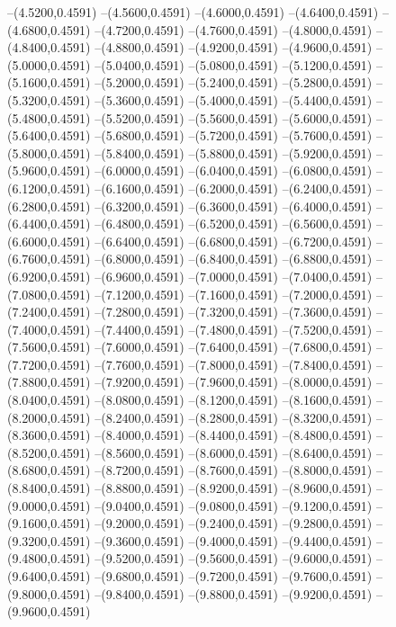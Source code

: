 {	--(4.5200,0.4591)
	--(4.5600,0.4591)
	--(4.6000,0.4591)
	--(4.6400,0.4591)
	--(4.6800,0.4591)
	--(4.7200,0.4591)
	--(4.7600,0.4591)
	--(4.8000,0.4591)
	--(4.8400,0.4591)
	--(4.8800,0.4591)
	--(4.9200,0.4591)
	--(4.9600,0.4591)
	--(5.0000,0.4591)
	--(5.0400,0.4591)
	--(5.0800,0.4591)
	--(5.1200,0.4591)
	--(5.1600,0.4591)
	--(5.2000,0.4591)
	--(5.2400,0.4591)
	--(5.2800,0.4591)
	--(5.3200,0.4591)
	--(5.3600,0.4591)
	--(5.4000,0.4591)
	--(5.4400,0.4591)
	--(5.4800,0.4591)
	--(5.5200,0.4591)
	--(5.5600,0.4591)
	--(5.6000,0.4591)
	--(5.6400,0.4591)
	--(5.6800,0.4591)
	--(5.7200,0.4591)
	--(5.7600,0.4591)
	--(5.8000,0.4591)
	--(5.8400,0.4591)
	--(5.8800,0.4591)
	--(5.9200,0.4591)
	--(5.9600,0.4591)
	--(6.0000,0.4591)
	--(6.0400,0.4591)
	--(6.0800,0.4591)
	--(6.1200,0.4591)
	--(6.1600,0.4591)
	--(6.2000,0.4591)
	--(6.2400,0.4591)
	--(6.2800,0.4591)
	--(6.3200,0.4591)
	--(6.3600,0.4591)
	--(6.4000,0.4591)
	--(6.4400,0.4591)
	--(6.4800,0.4591)
	--(6.5200,0.4591)
	--(6.5600,0.4591)
	--(6.6000,0.4591)
	--(6.6400,0.4591)
	--(6.6800,0.4591)
	--(6.7200,0.4591)
	--(6.7600,0.4591)
	--(6.8000,0.4591)
	--(6.8400,0.4591)
	--(6.8800,0.4591)
	--(6.9200,0.4591)
	--(6.9600,0.4591)
	--(7.0000,0.4591)
	--(7.0400,0.4591)
	--(7.0800,0.4591)
	--(7.1200,0.4591)
	--(7.1600,0.4591)
	--(7.2000,0.4591)
	--(7.2400,0.4591)
	--(7.2800,0.4591)
	--(7.3200,0.4591)
	--(7.3600,0.4591)
	--(7.4000,0.4591)
	--(7.4400,0.4591)
	--(7.4800,0.4591)
	--(7.5200,0.4591)
	--(7.5600,0.4591)
	--(7.6000,0.4591)
	--(7.6400,0.4591)
	--(7.6800,0.4591)
	--(7.7200,0.4591)
	--(7.7600,0.4591)
	--(7.8000,0.4591)
	--(7.8400,0.4591)
	--(7.8800,0.4591)
	--(7.9200,0.4591)
	--(7.9600,0.4591)
	--(8.0000,0.4591)
	--(8.0400,0.4591)
	--(8.0800,0.4591)
	--(8.1200,0.4591)
	--(8.1600,0.4591)
	--(8.2000,0.4591)
	--(8.2400,0.4591)
	--(8.2800,0.4591)
	--(8.3200,0.4591)
	--(8.3600,0.4591)
	--(8.4000,0.4591)
	--(8.4400,0.4591)
	--(8.4800,0.4591)
	--(8.5200,0.4591)
	--(8.5600,0.4591)
	--(8.6000,0.4591)
	--(8.6400,0.4591)
	--(8.6800,0.4591)
	--(8.7200,0.4591)
	--(8.7600,0.4591)
	--(8.8000,0.4591)
	--(8.8400,0.4591)
	--(8.8800,0.4591)
	--(8.9200,0.4591)
	--(8.9600,0.4591)
	--(9.0000,0.4591)
	--(9.0400,0.4591)
	--(9.0800,0.4591)
	--(9.1200,0.4591)
	--(9.1600,0.4591)
	--(9.2000,0.4591)
	--(9.2400,0.4591)
	--(9.2800,0.4591)
	--(9.3200,0.4591)
	--(9.3600,0.4591)
	--(9.4000,0.4591)
	--(9.4400,0.4591)
	--(9.4800,0.4591)
	--(9.5200,0.4591)
	--(9.5600,0.4591)
	--(9.6000,0.4591)
	--(9.6400,0.4591)
	--(9.6800,0.4591)
	--(9.7200,0.4591)
	--(9.7600,0.4591)
	--(9.8000,0.4591)
	--(9.8400,0.4591)
	--(9.8800,0.4591)
	--(9.9200,0.4591)
	--(9.9600,0.4591)
}
